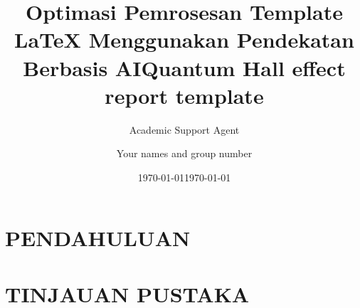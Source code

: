 \documentclass{article}
\title{Optimasi Pemrosesan Template LaTeX Menggunakan Pendekatan Berbasis AI}
\author{Academic Support Agent}
\date{\today}
\begin{document}
\maketitle

\begin{abstract}

\end{abstract}

\chapter{PENDAHULUAN}


\chapter{TINJAUAN PUSTAKA}



\usepackage[english]{babel}
\usepackage[utf8]{inputenc}
\usepackage{amsmath}
\usepackage{graphicx}
\usepackage[colorinlistoftodos]{todonotes}

\title{Quantum Hall effect report template}

\author{Your names and group number}

\date{\today}
\end{document}
